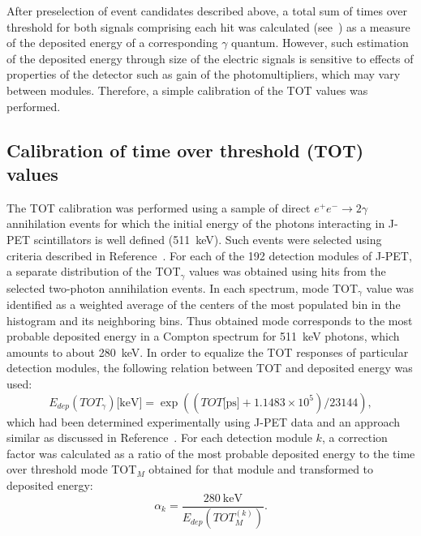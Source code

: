 After preselection of event candidates described above, a total sum of times over threshold for both signals comprising each hit was calculated (see~) as a measure of the deposited energy of a corresponding $\gamma$ quantum. However, such estimation of the deposited energy through size of the electric signals is sensitive to effects of properties of the detector such as gain of the photomultipliers, which may vary between modules. Therefore, a simple calibration of the TOT values was performed. 

\subsection{Calibration of time over threshold (TOT) values}
\label{sec:jpet_tot_calib}
The TOT calibration was performed using a sample of direct $e^+e^-\to 2\gamma$ annihilation events for which the initial energy of the photons interacting in J-PET scintillators is well defined (511~keV). Such events were selected using criteria described in Reference~\cite{monika_2gamma_imaging}. For each of the 192 detection modules of J-PET, a separate distribution of the TOT$_{\gamma}$ values was obtained using hits from the selected two-photon annihilation events. In each spectrum, mode TOT$_{\gamma}$ value was identified as a weighted average of the centers of the most populated bin in the histogram and its neighboring bins. Thus obtained mode corresponds to the most probable deposited energy in a Compton spectrum for 511~keV photons, which amounts to about 280~keV.
In order to equalize the TOT responses of particular detection modules,
the following relation between TOT and deposited energy was used:
\begin{equation}
  \label{eq:tot_edep}
  E_{dep}(TOT_{\gamma}) \text{[keV]} = \exp\left( \left( TOT\text{[ps]} + 1.1483\times 10^{5} \right) / 23144  \right),
\end{equation}
which had been determined experimentally using J-PET data and an approach similar as discussed in Reference~\cite{tot_edep}. For each detection module $k$, a correction factor was calculated as a ratio of the most probable deposited energy to the time over threshold mode TOT$_{M}$ obtained for that module and transformed to deposited energy:
\begin{equation}
  \label{eq:tot_corr}
  \alpha_{k} = \frac{280\ \text{keV}}{E_{dep}(TOT^{(k)}_{M})}.
\end{equation}

